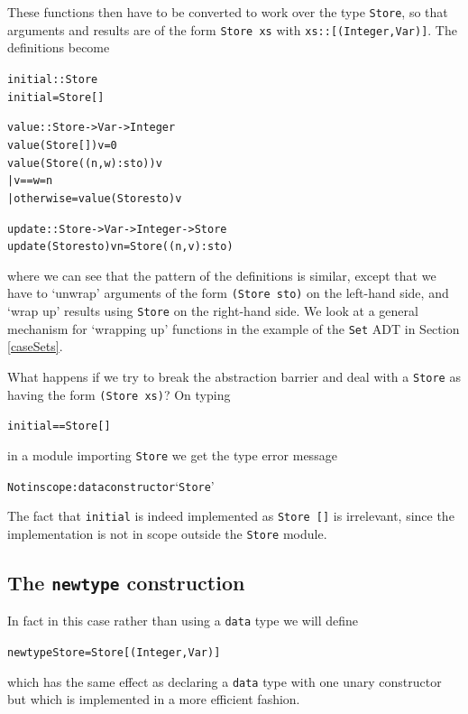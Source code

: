 These functions then have to be converted to work over the type \texttt{Store}, so that
arguments and results are of the form \texttt{Store xs}
with \texttt{xs::[(Integer,Var)]}. The definitions become
\begin{alltt}
initial :: Store 
initial = Store []

value  :: Store -> Var -> Integer
value (Store []) v  = 0
value (Store ((n,w):sto)) v 
  | v==w            = n
  | otherwise       = value (Store sto) v

update  :: Store -> Var -> Integer -> Store
update (Store sto) v n = Store ((n,v):sto)
\end{alltt}
where we can see that the pattern of the definitions is similar, except
that we have to `unwrap' arguments of the form \texttt{(Store sto)} on
the left-hand side, and  `wrap up' results using \texttt{Store} on the
right-hand side. We look at a general mechanism for `wrapping up'
functions in the example of the \texttt{Set} ADT in Section
\ref{caseSets}.

What happens if we try to
break the abstraction barrier and deal with a \texttt{Store} as having 
the form \texttt{(Store xs)}? On typing
\begin{alltt}
initial == Store []
\end{alltt}
in a module importing \texttt{Store}
we get the type error message
\begin{alltt}
Not in scope: data constructor `Store'
\end{alltt}
The fact that \texttt{initial} is indeed implemented as \texttt{Store []} is irrelevant,
since the implementation is not in scope outside the \texttt{Store} module.

\subsection*{The \texttt{newtype} construction}

In fact in this case rather than using a \texttt{data} type we will define 
\begin{alltt}
newtype Store = Store [ (Integer,Var) ]
\end{alltt}
which has the same effect as declaring a \texttt{data} type with one unary constructor
but which is implemented in a more efficient fashion. 


